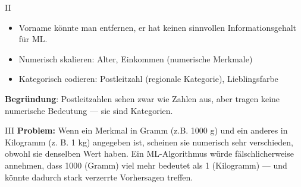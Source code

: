 \begin{aufgabe}{II}
\begin{itemize}
  \item Vorname könnte man entfernen, er hat keinen sinnvollen Informationsgehalt für ML.
  \item Numerisch skalieren: Alter, Einkommen (numerische Merkmale)  
  \item Kategorisch codieren: Postleitzahl (regionale Kategorie), Lieblingsfarbe  
\end{itemize}
\textbf{Begründung}: Postleitzahlen sehen zwar wie Zahlen aus, aber tragen keine numerische Bedeutung — sie sind Kategorien.
\end{aufgabe}

\begin{aufgabe}{III}
\textbf{Problem:}  
Wenn ein Merkmal in Gramm (z.B. 1000 g) und ein anderes in Kilogramm (z. B. 1 kg) angegeben ist, scheinen sie numerisch sehr verschieden, obwohl sie denselben Wert haben.  
Ein ML-Algorithmus würde fälschlicherweise annehmen, dass 1000 (Gramm) viel mehr bedeutet als 1 (Kilogramm) — und könnte dadurch stark verzerrte Vorhersagen treffen.
\end{aufgabe}